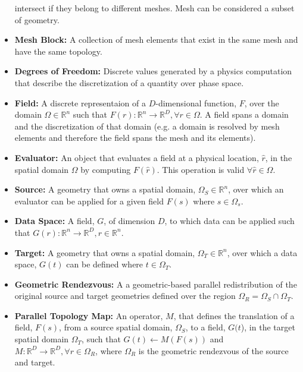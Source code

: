 \documentclass[letterpaper,12pt]{article}
\begin{document}
\begin{itemize}
  intersect if they belong to different meshes. Mesh can be considered
  a subset of geometry.
\item {\bf Mesh Block:} A collection of mesh elements that exist in
  the same mesh and have the same topology.
\item {\bf Degrees of Freedom:} Discrete values generated by a physics
  computation that describe the discretization of a quantity over
  phase space.
\item {\bf Field:} A discrete representaion of a $D$-dimensional
  function, $F$, over the domain $\Omega \in \mathbb{R}^n$ such that
  $F(r) : \mathbb{R}^n \rightarrow \mathbb{R}^D, \forall r \in
  \Omega$. A field spans a domain and the discretization of that
  domain (e.g. a domain is resolved by mesh elements and therefore the
  field spans the mesh and its elements).
\item {\bf Evaluator:} An object that evaluates a field at a physical
  location, $\hat{r}$, in the spatial domain $\Omega$ by computing
  $F(\hat{r})$. This operation is valid $\forall \hat{r} \in \Omega$.
\item {\bf Source:} A geometry that owns a spatial domain, $\Omega_S
  \in \mathbb{R}^n$, over which an evaluator can be applied for a
  given field $F(s)$ where $s \in \Omega_s$.
\item {\bf Data Space:} A field, $G$, of dimension $D$, to which data
  can be applied such that $G(r) : \mathbb{R}^n \rightarrow
  \mathbb{R}^D, r \in \mathbb{R}^n$.
\item {\bf Target:} A geometry that owns a spatial domain, $\Omega_T
  \in \mathbb{R}^n$, over which a data space, $G(t)$ can be defined
  where $t \in \Omega_T$.
\item{\bf Geometric Rendezvous:} A a geometric-based parallel
  redistribution of the original source and target geometries defined
  over the region $\Omega_R = \Omega_S \cap \Omega_T$.
\item{\bf Parallel Topology Map:} An operator, $M$, that defines the
  translation of a field, $F(s)$, from a source spatial domain,
  $\Omega_S$, to a field, $G(t$), in the target spatial domain
  $\Omega_T$, such that $G(t)\leftarrow M(F(s))$ and $M: \mathbb{R}^D
  \rightarrow \mathbb{R}^D, \forall r \in \Omega_R$, where $\Omega_R$
  is the geometric rendezvous of the source and target.
\end{itemize}

\clearpage

\end{document}
